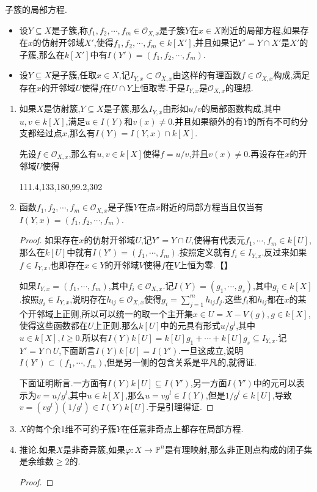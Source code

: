 子簇的局部方程.
\begin{itemize}
	\item 设$Y\subseteq X$是子簇,称$f_1,f_2,\cdots,f_m\in\mathscr{O}_{X,x}$是子簇$Y$在$x\in X$附近的局部方程,如果存在$x$的仿射开邻域$X'$,使得$f_1,f_2,\cdots,f_m\in k[X']$,并且如果记$Y'=Y\cap X'$是$X'$的子簇,那么在$k[X']$中有$I(Y')=(f_1,f_2,\cdots,f_m)$.
	\item 设$Y\subseteq X$是子簇,任取$x\in X$,记$I_{Y,x}\subset\mathscr{O}_{X,x}$由这样的有理函数$f\in\mathscr{O}_{X,x}$构成,满足存在$x$的开邻域$U$使得$f$在$U\cap Y$上恒取零.于是$I_{Y,x}$是$\mathscr{O}_{X,x}$的理想.
\end{itemize}
\begin{enumerate}
	\item 如果$X$是仿射簇,$Y\subseteq X$是子簇,那么$I_{Y,x}$由形如$u/v$的局部函数构成,其中$u,v\in k[X]$,满足$u\in I(Y)$和$v(x)\not=0$.并且如果额外的有$Y$的所有不可约分支都经过点$x$,那么有$I(Y)=I(Y,x)\cap k[X]$.
	
	先设$f\in\mathscr{O}_{X,x}$,那么有$u,v\in k[X]$使得$f=u/v$,并且$v(x)\not=0$.再设存在$x$的开邻域$U$使得
	
	
	111.4,133,180,99.2,302
	
	
	\item 函数$f_1,f_2,\cdots,f_m\in\mathscr{O}_{X,x}$是子簇$Y$在点$x$附近的局部方程当且仅当有$I(Y,x)=(f_1,f_2,\cdots,f_m)$.
	\begin{proof}
		
		如果存在$x$的仿射开邻域$U$,记$Y'=Y\cap U$,使得有代表元$f_1,\cdots,f_m\in k[U]$,那么在$k[U]$中就有$I(Y')=(f_1,\cdots,f_m)$.按照定义就有$f_i\in I_{Y,x}$.反过来如果$f\in I_{Y,x}$,也即存在$x\in Y$的开邻域$V$使得$f$在$V$上恒为零.【】
		
		如果$I_{Y,x}=(f_1,\cdots,f_m)$,其中$f_i\in\mathscr{O}_{X,x}$.记$I(Y)=(g_1,\cdots,g_s)$,其中$g_i\in k[X]$.按照$g_i\in I_{Y,x}$,说明存在$h_{ij}\in\mathscr{O}_{X,x}$使得$g_i=\sum_{j=1}^mh_{ij}f_j$.这些$f_i$和$h_{ij}$都在$x$的某个开邻域上正则,所以可以统一的取一个主开集$x\in U=X-V(g),g\in k[X]$,使得这些函数都在$U$上正则.那么$k[U]$中的元具有形式$u/g^l$,其中$u\in k[X],l\ge0$.所以有$I(Y)k[U]=k[U]g_1+\cdots+k[U]g_s\subseteq I_{Y,x}$.记$Y'=Y\cap U$,下面断言$I(Y)k[U]=I(Y')$.一旦这成立,说明$I(Y')\subset(f_1,\cdots,f_m)$,但是另一侧的包含关系是平凡的,就得证.
		
		\qquad
		
		下面证明断言.一方面有$I(Y)k[U]\subseteq I(Y')$,另一方面$I(Y')$中的元可以表示为$v=u/g^l$,其中$u\in k[X]$,那么$u=vg^l\in I(Y)$,但是$1/g^l\in k[U]$,导致$v=(vg^l)(1/g^l)\in I(Y)k[U]$.于是引理得证.
	\end{proof}
    \item $X$的每个余1维不可约子簇$Y$在任意非奇点上都存在局部方程.
    \item 推论.如果$X$是非奇异簇,如果$\varphi:X\to\mathbb{P}^n$是有理映射,那么非正则点构成的闭子集是余维数$\ge2$的.
    \begin{proof}
    	

\end{proof}
\end{enumerate}
